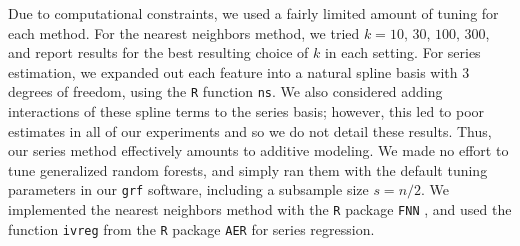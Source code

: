 \documentclass[aos]{imsart}
\theoremstyle{plain}
\theoremstyle{definition}
\theoremstyle{remark}
\begin{document}
\begin{CJK}{UTF8}{gbsn}
{\begin{appendix}
Due to computational constraints, we used a fairly limited amount of tuning for each method.
For the nearest neighbors method, we tried $k = 10, \, 30, \, 100, \, 300$,
and report results for the best resulting choice of $k$ in each setting.
For series estimation, we expanded out each feature into a natural spline basis with
3 degrees of freedom, using the \texttt{R} function \texttt{ns}. We also considered adding
interactions of these spline terms to the series basis; however, this led to poor estimates
in all of our experiments and so we do not detail these results. Thus, our series method
effectively amounts to additive modeling.
We made no effort to tune generalized random forests, and simply ran them with the default
tuning parameters in our \texttt{grf} software, including a subsample size $s = n/2$.
We implemented the nearest neighbors method with the \texttt{R} package \texttt{FNN}
\citep{beygelzimer2013fnn}, and used the function \texttt{ivreg} from the \texttt{R}
package \texttt{AER} \citep{kleiber2008applied} for series regression.


\end{appendix}}
\end{CJK}
\end{document}
